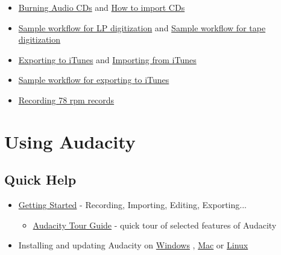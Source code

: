 \begin{multicols}{2}
\begin{itemize}
\item 
\hyperref[\foo{man_burning_music_files_to_a_cd_}]{Burning Audio CDs}
 and 
\hyperref[\foo{man_tutorial_how_to_import_cds_}]{How to import CDs}

\item 
\hyperref[\foo{man_sample_workflow_for_lp_digitization_}]{Sample workflow for LP digitization}
 and 
\hyperref[\foo{man_sample_workflow_for_tape_digitization_}]{Sample workflow for tape digitization}

\end{itemize}

\begin{itemize}
\item 
\hyperref[\foo{man_tutorial_exporting_to_itunes_}]{Exporting to iTunes}
 and 
\hyperref[\foo{man_tutorial_how_to_import_files_from_itunes_}]{Importing from iTunes}

\item 
\hyperref[\foo{man_sample_workflow_for_exporting_to_itunes_}]{Sample workflow for exporting to iTunes}

\end{itemize}

\begin{itemize}
\item 
\hyperref[\foo{man_recording_78_rpm_records_}]{Recording 78 rpm records}

\end{itemize}

\label{index_bottom_using}
\label{index_using}
\section{Using Audacity}
\subsection{Quick Help}
\begin{itemize}
\item 
\hyperref[\foo{quick_help_}]{Getting Started}
 - Recording, Importing, Editing, Exporting...

\begin{itemize}
\item 
\hyperref[\foo{man_audacity_tour_guide_}]{Audacity Tour Guide}
 - quick tour of selected features of Audacity
\end{itemize}

\item Installing and updating Audacity on 
\hyperref[\foo{man_installing_and_updating_audacity_on_windows_}]{Windows}
, 
\hyperref[\foo{man_installing_and_updating_audacity_on_mac_os_x_}]{Mac}
 or 
\hyperref[\foo{man_installing_and_updating_audacity_on_linux_}]{Linux}


\end{itemize}
\end{multicols}
